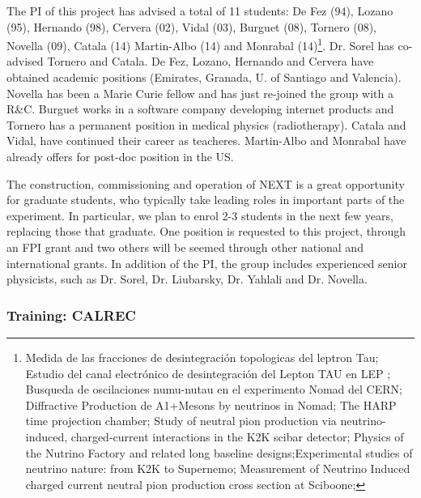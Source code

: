 The PI of this project has advised a total of 11 students: De Fez (94), Lozano (95), Hernando (98), Cervera (02), Vidal (03), Burguet (08), Tornero (08), Novella (09), Catala (14) Martin-Albo (14) and Monrabal (14)\footnote{Medida de las fracciones de desintegración topologicas del leptron Tau; Estudio del canal electrónico de desintegración del Lepton TAU en LEP ; Busqueda de oscilaciones numu-nutau en el experimento Nomad del CERN; Diffractive Production de A1+Mesons by neutrinos in Nomad; The HARP time projection chamber; Study of neutral pion production via neutrino-induced, charged-current interactions in the K2K scibar detector; Physics of the Nutrino Factory and related long baseline designs;Experimental studies of neutrino nature: from K2K to Supernemo; Measurement of Neutrino Induced charged current neutral pion production cross section at Sciboone; }. Dr. Sorel has co-advised Tornero and Catala. De Fez, Lozano, Hernando and Cervera have obtained academic positions (Emirates, Granada, U. of Santiago and Valencia). Novella has been a Marie Curie fellow and has just re-joined the group with a R\&C. Burguet works in a software company developing internet products and Tornero has a permanent position in medical physics (radiotherapy). Catala and Vidal, have continued their career as teacheres. Martin-Albo and Monrabal have already offers for post-doc position in the US.

The construction, commissioning and operation of NEXT is a great opportunity for graduate students, who typically take leading roles in important parts of the experiment. In particular, we plan to enrol 2-3 students in the next few years, replacing those that graduate. One position is requested to this project, through an FPI grant and two others will be seemed through other national and international grants. In addition of the PI, the group includes experienced senior physicists, such as Dr. Sorel, Dr. Liubarsky, Dr. Yahlali and Dr. Novella. 

\subsubsection*{Training: CALREC}

